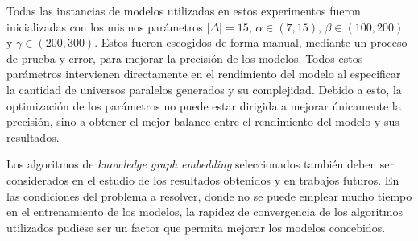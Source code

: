     Todas las instancias de modelos utilizadas en estos experimentos fueron
    inicializadas con los mismos par\'ametros $|\Delta| = 15$, $\alpha \in (7,15)$, $\beta \in (100, 200)$ y $\gamma \in (200, 300)$.
    Estos fueron escogidos de forma manual, mediante un proceso de prueba y error, para mejorar
    la precisi\'on de los modelos. Todos estos par\'ametros intervienen
    directamente en el rendimiento del modelo al especificar
    la cantidad de universos paralelos generados y su complejidad. Debido a
    esto, la optimizaci\'on de los par\'ametros no puede estar dirigida a mejorar 
    \'unicamente la precisi\'on, sino a obtener el mejor balance entre el rendimiento del modelo y sus resultados.

    Los algoritmos de \textit{knowledge graph embedding} seleccionados tambi\'en deben ser considerados
    en el estudio de los resultados obtenidos y en trabajos futuros. En las condiciones del problema a resolver, donde
    no se puede emplear mucho tiempo en el entrenamiento de los modelos, la rapidez de convergencia
    de los algoritmos utilizados pudiese ser un factor que permita mejorar los modelos concebidos.